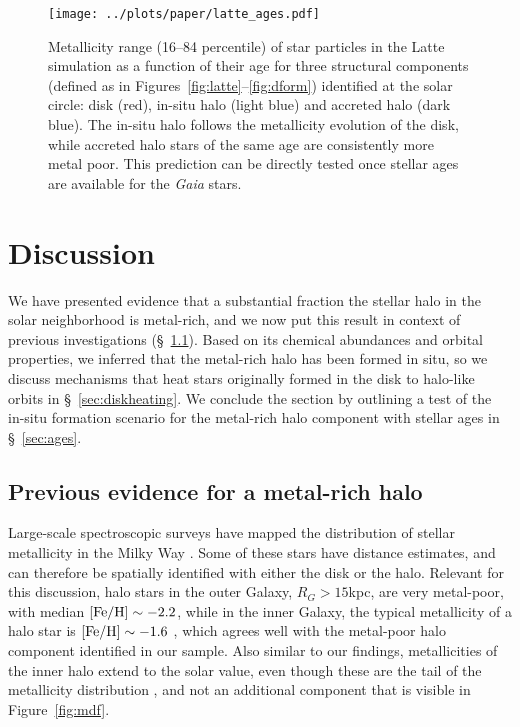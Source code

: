 \documentclass[apj, twocolappendix, numberedappendix, appendixfloats]{emulateapj}
\begin{document}
\begin{figure}
\begin{center}
\texttt{[image: ../plots/paper/latte\_ages.pdf]}
\caption{Metallicity range (16--84 percentile) of star particles in the Latte simulation as a function of their age for three structural components (defined as in Figures~\ref{fig:latte}--\ref{fig:dform}) identified at the solar circle: disk (red), in-situ halo (light blue) and accreted halo (dark blue).
The in-situ halo follows the metallicity evolution of the disk, while accreted halo stars of the same age are consistently more metal poor.
This prediction can be directly tested once stellar ages are available for the \emph{Gaia} stars.}
\label{fig:ages}
\end{center}
\end{figure}


\section{Discussion}
\label{sec:discussion}
We have presented evidence that a substantial fraction the stellar halo in the solar neighborhood is metal-rich, and we now put this result in context of previous investigations (\S~\ref{sec:previous}).
Based on its chemical abundances and orbital properties, we inferred that the metal-rich halo has been formed in situ, so we discuss mechanisms that heat stars originally formed in the disk to halo-like orbits in \S~\ref{sec:diskheating}.
We conclude the section by outlining a test of the in-situ formation scenario for the metal-rich halo component with stellar ages in \S~\ref{sec:ages}.

\subsection{Previous evidence for a metal-rich halo}
\label{sec:previous}
Large-scale spectroscopic surveys have mapped the distribution of stellar metallicity in the Milky Way \citep[e.g.,][]{ivezic2008}.
Some of these stars have distance estimates, and can therefore be spatially identified with either the disk or the halo.
Relevant for this discussion, halo stars in the outer Galaxy, $R_{G}>15$\;kpc, are very metal-poor, with median $\rm[Fe/H]\sim-2.2$, while in the inner Galaxy, the typical metallicity of a halo star is $\rm[Fe/H]\sim-1.6$ \citep[e.g.,][]{carollo2007, dejong2010}, which agrees well with the metal-poor halo component identified in our sample.
Also similar to our findings, metallicities of the inner halo extend to the solar value, even though these are the tail of the metallicity distribution \citep[e.g.,][]{allendeprieto2006}, and not an additional component that is visible in Figure~\ref{fig:mdf}.
\end{document}
